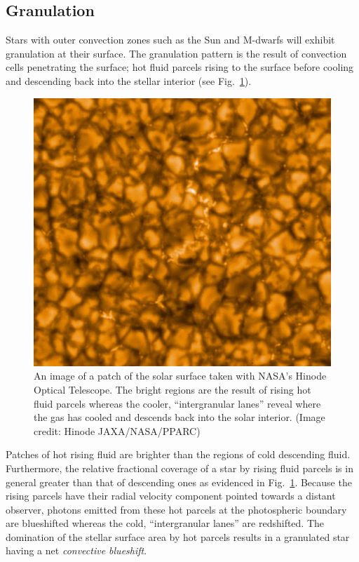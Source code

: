 \subsection{Granulation}
Stars with outer convection zones such as the Sun and M-dwarfs will exhibit granulation 
at their surface. The granulation pattern is the result 
of convection cells penetrating the surface; hot fluid parcels rising to the surface before 
cooling and descending back into the stellar interior (see Fig.~\ref{fig:granulation}). \\

\begin{figure}
\centering
\includegraphics[scale=.2]{figures/solargranulation.jpg}
\caption{An image of a patch of the solar surface taken with NASA's Hinode Optical 
Telescope. The bright regions are the result of rising hot fluid parcels whereas the cooler, 
``intergranular lanes'' reveal where the gas has cooled and descends back into the solar 
interior. (Image credit: Hinode JAXA/NASA/PPARC) \label{fig:granulation}}
\end{figure}

Patches of hot rising fluid are brighter than the regions of cold descending fluid. 
Furthermore, the relative fractional coverage of a star by rising fluid parcels is 
in general greater than that of descending ones as evidenced in Fig.~\ref{fig:granulation}. 
Because the rising parcels have their radial velocity component pointed towards a distant 
observer, photons emitted from these hot parcels at the photospheric boundary are blueshifted 
whereas the cold, ``intergranular lanes'' are redshifted. The domination of the stellar 
surface area by hot parcels results in a granulated star having a net \emph{convective 
blueshift}. \\

